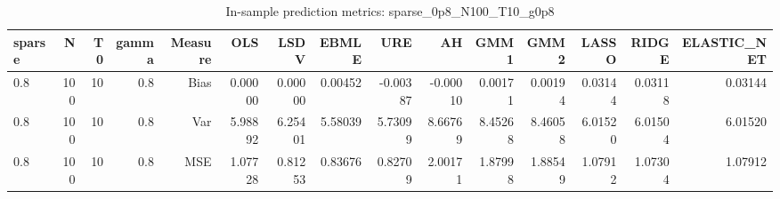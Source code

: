 \begin{table}[!htbp]\centering
\caption{In-sample prediction metrics: sparse_0p8_N100_T10_g0p8}
\label{tab:table2_sparse_0p8_N100_T10_g0p8}
\begin{tabular}{lrrrrrrrrrrrrrr}
\hline
sparse & N & T0 & gamma & Measure & OLS & LSDV & EBMLE & URE & AH & GMM1 & GMM2 & LASSO & RIDGE & ELASTIC_NET \\
\hline
0.8 & 100 & 10 & 0.8 & Bias & 0.00000 & 0.00000 & 0.00452 & -0.00387 & -0.00010 & 0.00171 & 0.00194 & 0.03144 & 0.03118 & 0.03144 \\
0.8 & 100 & 10 & 0.8 & Var & 5.98892 & 6.25401 & 5.58039 & 5.73099 & 8.66769 & 8.45268 & 8.46058 & 6.01520 & 6.01504 & 6.01520 \\
0.8 & 100 & 10 & 0.8 & MSE & 1.07728 & 0.81253 & 0.83676 & 0.82709 & 2.00171 & 1.87998 & 1.88549 & 1.07912 & 1.07304 & 1.07912 \\
\hline
\end{tabular}
\end{table}

